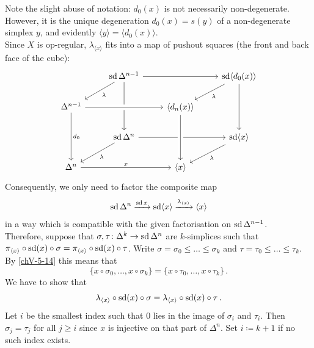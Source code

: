         Note the slight abuse of notation: $d_0(x)$ is not necessarily non-degenerate. However, it is the unique degeneration $d_0(x) = s(y)$ of a non-degenerate simplex $y$, and evidently $\langle y \rangle = \langle d_0(x) \rangle$.\\
        Since $X$ is op-regular, $\lambda_{\langle x \rangle}$ fits into a map of pushout squares (the front and back face of the cube):
        \begin{equation*}
            \begin{tikzcd}
                & \sd \Delta^{n-1} \arrow[ld, "\lambda"] \arrow[dd] \arrow[rr] & & \sd \langle d_0(x) \rangle \arrow[ld, "\lambda"] \arrow[dd] \\
                \Delta^{n-1} \arrow[dd, "d_0"] \arrow[rr, crossing over] & & \langle d_n(x) \rangle & \\
                & \sd \Delta^n \arrow[ld, "\lambda"] \arrow[rr] & & \sd \langle x \rangle \arrow[ld, "\lambda"] \\
                \Delta^n \arrow[rr, "x"] & & \langle x \rangle \arrow[from=uu, crossing over] &
            \end{tikzcd}
        \end{equation*}
        Consequently, we only need to factor the composite map
        \begin{equation*}
            \operatorname{sd} \Delta^n \xrightarrow{\operatorname{sd} x} \operatorname{sd} \langle x \rangle \xrightarrow{\lambda_{\langle x \rangle}} \langle x \rangle
        \end{equation*}
        in a way which is compatible with the given factorisation on $\operatorname{sd} \Delta^{n-1}$.\\
        Therefore, suppose that $\sigma, \tau \colon \Delta^k \to \operatorname{sd} \Delta^n$ are $k$-simplices such that $\pi_{\langle x \rangle} \circ \operatorname{sd}(x) \circ \sigma = \pi_{\langle x \rangle} \circ \operatorname{sd}(x) \circ \tau$. Write $\sigma = \sigma_0 \leq \ldots \leq \sigma_k$ and $\tau = \tau_0 \leq \ldots \leq \tau_k$. By \ref{chV-5-14} this means that
        \begin{equation*}
            \{ x \circ \sigma_0, \ldots, x \circ \sigma_k \} = \{ x \circ \tau_0, \ldots, x \circ \tau_k\} \,.
        \end{equation*}
        We have to show that
        \begin{equation*}
            \lambda_{\langle x \rangle} \circ \operatorname{sd}(x) \circ \sigma = \lambda_{\langle x \rangle} \circ \operatorname{sd}(x) \circ \tau \,.
        \end{equation*}
        Let $i$ be the smallest index such that $0$ lies in the image of $\sigma_i$ and $\tau_i$. Then $\sigma_j = \tau_j$ for all $j \geq i$ since $x$ is injective on that part of $\Delta^n$. Set $i \coloneq k +1$ if no such index exists.\\
